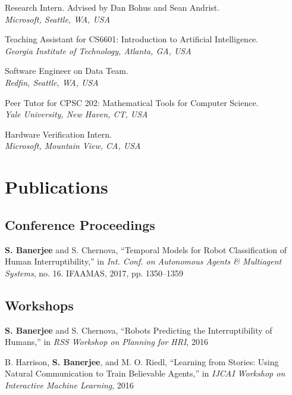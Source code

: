 \documentclass[letterpaper]{article}
\renewenvironment{itemize}{
  \begin{list}{}{
    \setlength{\leftmargin}{1.5em}
  }
}{
  \end{list}
}
\begin{document}
\begin{description}[leftmargin=7.5em, style=nextline]
  \item[Summer 2017] Research Intern. Advised by Dan Bohus and Sean Andrist. \\ \textit{Microsoft, Seattle, WA, USA}

  \item[Fall 2016] Teaching Assistant for CS6601: Introduction to Artificial Intelligence. \\ \textit{Georgia Institute of Technology, Atlanta, GA, USA}

  \item[2013 --- 2015] Software Engineer on Data Team. \\ \textit{Redfin, Seattle, WA, USA}

  \item[2012 --- 2013] Peer Tutor for CPSC 202: Mathematical Tools for Computer Science. \\ \textit{Yale University, New Haven, CT, USA}

  \item[Summer 2012] Hardware Verification Intern. \\ \textit{Microsoft, Mountain View, CA, USA}
\end{description}


\section*{Publications}

\subsection*{Conference Proceedings}

\begin{itemize}
  \item \textbf{S. Banerjee} and S. Chernova, ``Temporal Models for Robot Classification of Human Interruptibility,'' in \textit{Int. Conf. on Autonomous Agents \& Multiagent Systems}, no. 16. IFAAMAS, 2017, pp. 1350--1359
\end{itemize}

\subsection*{Workshops}

\begin{itemize}
  \item \textbf{S. Banerjee} and S. Chernova, ``Robots Predicting the Interruptibility of Humans,'' in \textit{RSS Workshop on Planning for HRI}, 2016

  \item B. Harrison, \textbf{S. Banerjee}, and M. O. Riedl, ``Learning from Stories: Using Natural Communication to Train Believable Agents,'' in \textit{IJCAI Workshop on Interactive Machine Learning}, 2016
\end{itemize}
\end{document}
